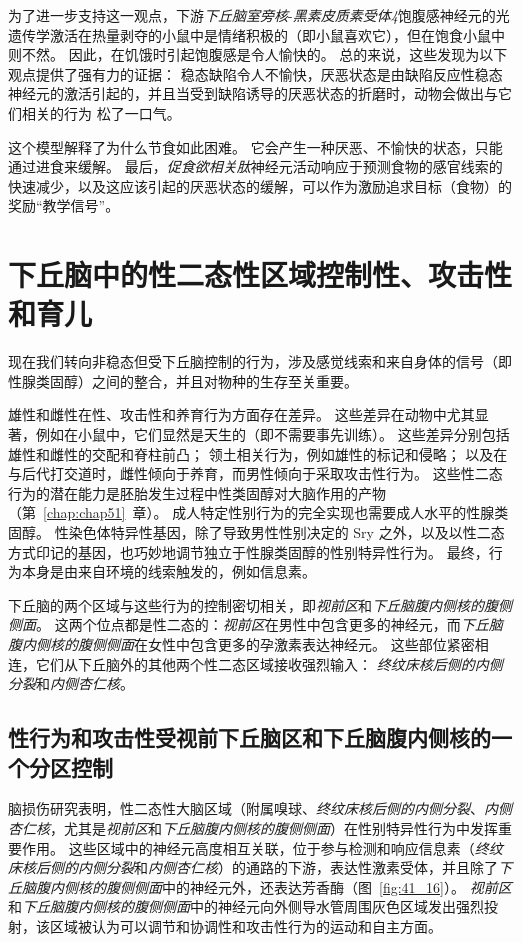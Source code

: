 为了进一步支持这一观点，下游\textit{下丘脑室旁核}-\textit{黑素皮质素受体4}饱腹感神经元的光遗传学激活在热量剥夺的小鼠中是情绪积极的（即小鼠喜欢它），但在饱食小鼠中则不然。
因此，在饥饿时引起饱腹感是令人愉快的。
总的来说，这些发现为以下观点提供了强有力的证据：
稳态缺陷令人不愉快，厌恶状态是由缺陷反应性稳态神经元的激活引起的，并且当受到缺陷诱导的厌恶状态的折磨时，动物会做出与它们相关的行为 松了一口气。


这个模型解释了为什么节食如此困难。
它会产生一种厌恶、不愉快的状态，只能通过进食来缓解。
最后，\textit{促食欲相关肽}神经元活动响应于预测食物的感官线索的快速减少，以及这应该引起的厌恶状态的缓解，可以作为激励追求目标（食物）的奖励“教学信号”。



\section{下丘脑中的性二态性区域控制性、攻击性和育儿}

现在我们转向非稳态但受下丘脑控制的行为，涉及感觉线索和来自身体的信号（即性腺类固醇）之间的整合，并且对物种的生存至关重要。


雄性和雌性在性、攻击性和养育行为方面存在差异。
这些差异在动物中尤其显著，例如在小鼠中，它们显然是天生的（即不需要事先训练）。
这些差异分别包括雄性和雌性的交配和脊柱前凸；
领土相关行为，例如雄性的标记和侵略； 以及在与后代打交道时，雌性倾向于养育，而男性倾向于采取攻击性行为。
这些性二态行为的潜在能力是胚胎发生过程中性类固醇对大脑作用的产物（第~\ref{chap:chap51}~章）。
成人特定性别行为的完全实现也需要成人水平的性腺类固醇。
性染色体特异性基因，除了导致男性性别决定的 Sry 之外，以及以性二态方式印记的基因，也巧妙地调节独立于性腺类固醇的性别特异性行为。
最终，行为本身是由来自环境的线索触发的，例如信息素。


下丘脑的两个区域与这些行为的控制密切相关，即\textit{视前区}和\textit{下丘脑腹内侧核的腹侧侧面}。
这两个位点都是性二态的：\textit{视前区}在男性中包含更多的神经元，而\textit{下丘脑腹内侧核的腹侧侧面}在女性中包含更多的孕激素表达神经元。
这些部位紧密相连，它们从下丘脑外的其他两个性二态区域接收强烈输入：
\textit{终纹床核后侧的内侧分裂}和\textit{内侧杏仁核}。



\subsection{性行为和攻击性受视前下丘脑区和下丘脑腹内侧核的一个分区控制}

脑损伤研究表明，性二态性大脑区域（附属嗅球、\textit{终纹床核后侧的内侧分裂}、\textit{内侧杏仁核}，尤其是\textit{视前区}和\textit{下丘脑腹内侧核的腹侧侧面}）在性别特异性行为中发挥重要作用。
这些区域中的神经元高度相互关联，位于参与检测和响应信息素（\textit{终纹床核后侧的内侧分裂}和\textit{内侧杏仁核}）的通路的下游，表达性激素受体，并且除了\textit{下丘脑腹内侧核的腹侧侧面}中的神经元外，还表达芳香酶（图~\ref{fig:41_16}）。
\textit{视前区}和\textit{下丘脑腹内侧核的腹侧侧面}中的神经元向外侧导水管周围灰色区域发出强烈投射，该区域被认为可以调节和协调性和攻击性行为的运动和自主方面。


